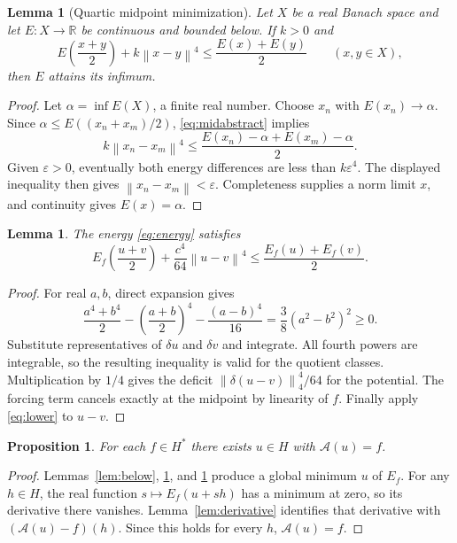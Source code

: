 \documentclass[11pt]{article}
\newtheorem{lemma}[theorem]{Lemma}
\newtheorem{proposition}[theorem]{Proposition}
\theoremstyle{remark}\newtheorem{remark}[theorem]{Remark}
\newcommand{\R}{\mathbb R}
\newcommand{\norm}[1]{\left\lVert#1\right\rVert}
\newcommand{\A}{\mathcal A}
\begin{document}
\begin{lemma}[Quartic midpoint minimization]\label{lem:min}
Let $X$ be a real Banach space and let $E:X\to\R$ be continuous and
bounded below. If $k>0$ and
\begin{equation}\label{eq:midabstract}
 E\left(\frac{x+y}2\right)+k\norm{x-y}^4
 \leq\frac{E(x)+E(y)}2\qquad(x,y\in X),
\end{equation}
then $E$ attains its infimum.
\end{lemma}
\begin{proof}
Let $\alpha=\inf E(X)$, a finite real number. Choose $x_n$ with
$E(x_n)\to\alpha$. Since $\alpha\leq E((x_n+x_m)/2)$,
\eqref{eq:midabstract} implies
\[
 k\norm{x_n-x_m}^4\leq
 \frac{E(x_n)-\alpha+E(x_m)-\alpha}{2}.
\]
Given $\varepsilon>0$, eventually both energy differences are less
than $k\varepsilon^4$. The displayed inequality then gives
$\norm{x_n-x_m}<\varepsilon$. Completeness supplies a norm limit
$x$, and continuity gives $E(x)=\alpha$.
\end{proof}

\begin{lemma}\label{lem:mid}
The energy \eqref{eq:energy} satisfies
\begin{equation}\label{eq:mid}
 E_f\left(\frac{u+v}2\right)+\frac{c^4}{64}\norm{u-v}^4
 \leq\frac{E_f(u)+E_f(v)}2.
\end{equation}
\end{lemma}
\begin{proof}
For real $a,b$, direct expansion gives
\[
 \frac{a^4+b^4}{2}-\left(\frac{a+b}2\right)^4
 -\frac{(a-b)^4}{16}=\frac38(a^2-b^2)^2\geq0.
\]
Substitute representatives of $\delta u$ and $\delta v$ and
integrate. All fourth powers are integrable, so the resulting
inequality is valid for the quotient classes. Multiplication by $1/4$
gives the deficit $\norm{\delta(u-v)}_4^4/64$ for the potential.
The forcing term cancels exactly at the midpoint by linearity of $f$.
Finally apply \eqref{eq:lower} to $u-v$.
\end{proof}

\begin{proposition}\label{prop:onto}
For each $f\in H^*$ there exists $u\in H$ with $\A(u)=f$.
\end{proposition}
\begin{proof}
Lemmas~\ref{lem:below}, \ref{lem:mid}, and \ref{lem:min} produce a
global minimum $u$ of $E_f$. For any $h\in H$, the real function
$s\mapsto E_f(u+sh)$ has a minimum at zero, so its derivative there
vanishes. Lemma~\ref{lem:derivative} identifies that derivative with
$(\A(u)-f)(h)$. Since this holds for every $h$, $\A(u)=f$.
\end{proof}
\end{document}
